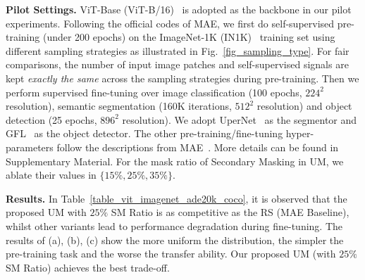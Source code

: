 \documentclass{article}
\begin{document}
\textbf{Pilot Settings.} ViT-Base (ViT-B/16)~\cite{dosovitskiy2020image} is adopted as the backbone in our pilot experiments. Following the official codes of MAE, we first do self-supervised pre-training (under 200 epochs) on the ImageNet-1K (IN1K)~\cite{deng2009imagenet} training set using different sampling strategies as illustrated in Fig.~\ref{fig_sampling_type}. For fair comparisons, the number of input image patches and self-supervised signals are kept \emph{exactly the same} across the sampling strategies during pre-training. Then we perform supervised fine-tuning over image classification (100 epochs, $224^2$ resolution), semantic segmentation (160K iterations, $512^2$ resolution) and object detection (25 epochs, $896^2$ resolution). We adopt UperNet~\cite{xiao2018unified} as the segmentor and GFL~\cite{li2020generalized} as the object detector.
The other pre-training/fine-tuning hyper-parameters follow the descriptions from MAE~\cite{he2021masked}. More details can be found in Supplementary Material. For the mask ratio of Secondary Masking in UM, we ablate their values in $\{15\%, 25\%, 35\%\}$.

\textbf{Results.} In Table~\ref{table_vit_imagenet_ade20k_coco}, it is observed that the proposed UM with $25\%$ SM Ratio is as competitive as the RS (MAE Baseline), whilst other variants lead to performance degradation during fine-tuning. The results of (a), (b), (c) show the more uniform the distribution, the simpler the pre-training task and the worse the transfer ability. Our proposed UM (with $25\%$ SM Ratio) achieves the best trade-off.
\end{document}
